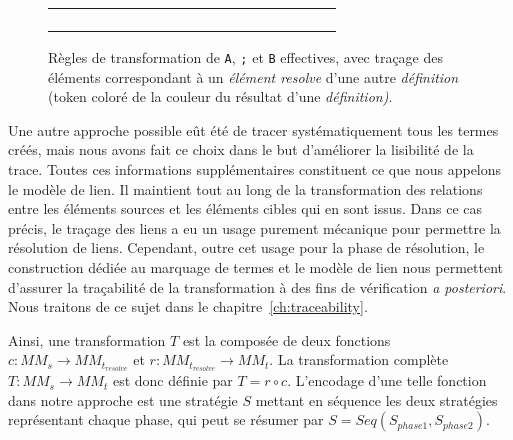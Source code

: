\begin{figure}[h]
  \centering
\begin{tabular}{c|c|c}
  \begin{subfigure}{0.30\textwidth}
    \centering
    
    \subcaption{}
  \end{subfigure}
  &
  \begin{subfigure}{0.30\textwidth}
    \centering
    
    \subcaption{}
  \end{subfigure}
  &
  \begin{subfigure}{0.30\textwidth}
    \centering
    
    \subcaption{}
  \end{subfigure}
\end{tabular}
  \caption{Règles de transformation de \texttt{A}, \texttt{;} et \texttt{B}
effectives, avec traçage des éléments correspondant à un \emph{élément resolve}
d'une autre \emph{définition} (token coloré de la couleur du résultat d'une
\emph{définition)}.}
  \label{fig:approachSimpleRulesTrace}
\end{figure}

Une autre approche possible eût été de tracer systématiquement tous les termes
créés, mais nous avons fait ce choix dans le but d'améliorer la lisibilité de
la trace. %
Toutes ces informations
supplémentaires constituent ce que nous appelons le modèle de lien. Il
maintient tout au long de la transformation des relations entre les éléments
sources et les éléments cibles qui en sont issus. 
Dans ce cas précis, le traçage des liens a eu un usage purement mécanique pour
permettre la résolution de liens. Cependant, outre cet usage pour la phase de
résolution, le construction dédiée au marquage de termes et le modèle de lien
nous permettent d'assurer la traçabilité de la transformation à des fins de
vérification \emph{a posteriori}. Nous traitons de ce sujet dans le
chapitre~\ref{ch:traceability}.

Ainsi, une transformation $T$ est la composée de deux fonctions $c : MM_s
\rightarrow MM_{t_{resolve}}$ et $r : MM_{t_{resolve}} \rightarrow MM_t$. La
transformation complète $T : MM_s \rightarrow MM_t$ est donc définie par $T = r
\circ c$. L'encodage d'une telle fonction dans notre approche est une stratégie
$S$ mettant en séquence les deux stratégies représentant chaque phase,  qui
peut se résumer par $S = Seq(S_{phase1}, S_{phase2})$.

